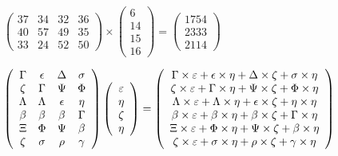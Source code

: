 \documentclass[12pt]{article}
\begin{document}
 

 
$\left( \begin{array}{ccccccccccccccc}
 37  & 
 34  & 
 32  & 
 36  \\ 
 40  & 
 57  & 
 49  & 
 35  \\ 
 33  & 
 24  & 
 52  & 
 50
\end{array}\right) \times
\left( \begin{array}{c}
 6  \\ 
 14  \\ 
 15  \\ 
 16
\end{array}\right)  =
\left( \begin{array}{c}
 1754  \\ 
 2333  \\ 
 2114
\end{array}\right)  $
 
$  %
 \left( \begin{array}
 {
 c
 c
 c
 c
 }
 \Gamma & 
 \epsilon & 
 \Delta & 
 \sigma \\ 
                    \zeta & 
 \Gamma & 
 \Psi & 
 \Phi \\ 
 \Lambda & 
 \Lambda & 
 \epsilon & 
 \eta \\ 
 \beta & 
 \beta & 
 \beta & 
 \Gamma \\ 
                    \Xi & 
 \Phi & 
 \Psi & 
 \beta \\ 
                    \zeta & 
 \sigma & 
 \rho & 
 \gamma
 \end{array} \right)
 \left( \begin{array}
 {
 c
 }
 \varepsilon \\ 
 \eta \\ 
                    \zeta \\ 
 \eta
 \end{array} \right)
=
  \left( \begin{array}
 {
 c
 }
 \Gamma \times  \varepsilon   +  \epsilon \times  \eta   +  \Delta \times                     \zeta   +  \sigma \times  \eta \\ 
                    \zeta \times  \varepsilon   +  \Gamma \times  \eta   +  \Psi \times                     \zeta   +  \Phi \times  \eta \\ 
 \Lambda \times  \varepsilon   +  \Lambda \times  \eta   +  \epsilon \times                     \zeta   +  \eta \times  \eta \\ 
 \beta \times  \varepsilon   +  \beta \times  \eta   +  \beta \times                     \zeta   +  \Gamma \times  \eta \\ 
                    \Xi \times  \varepsilon   +  \Phi \times  \eta   +  \Psi \times                     \zeta   +  \beta \times  \eta \\ 
                    \zeta \times  \varepsilon   +  \sigma \times  \eta   +  \rho \times                     \zeta   +  \gamma \times  \eta
 \end{array} \right)
$
 
\end{document}
